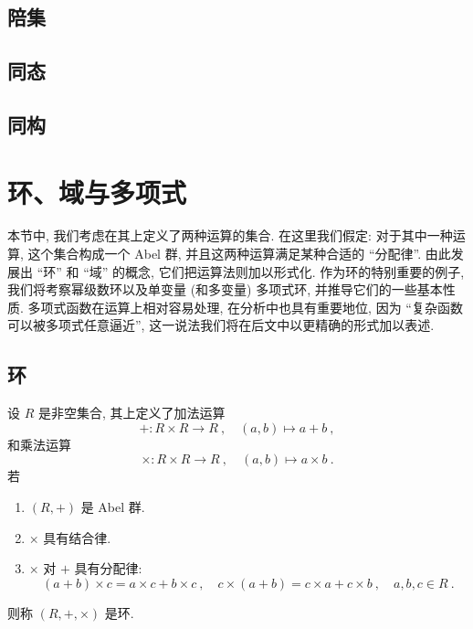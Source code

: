 \subsection{陪集}

\subsection{同态}

\begin{remark}\label{rem:group-homo}
    
\end{remark}

\subsection{同构}

\newpage

\section{环、域与多项式}

本节中, 我们考虑在其上定义了两种运算的集合. 在这里我们假定: 对于其中一种运算, 这个集合构成一个 Abel 群, 并且这两种运算满足某种合适的 ``分配律''. 由此发展出 ``环'' 和 ``域'' 的概念, 它们把运算法则加以形式化. 作为环的特别重要的例子, 我们将考察幂级数环以及单变量 (和多变量) 多项式环, 并推导它们的一些基本性质. 多项式函数在运算上相对容易处理, 在分析中也具有重要地位, 因为 ``复杂函数可以被多项式任意逼近'', 这一说法我们将在后文中以更精确的形式加以表述.

\subsection{环}

\begin{axiom}[环]\label{ax:ring}
    设 \(R\) 是非空集合, 其上定义了加法运算
    \[
        + \colon R \times R \to R\ ,\quad (a, b) \mapsto a + b\ ,
    \]
    和乘法运算
    \[
    \times \colon R \times R \to R\ ,\quad (a, b) \mapsto a \times b\ .
    \]
    若
    \begin{enumerate}[label={\((\mathrm R_{\arabic*})\)}]
        \item \((R, +)\) 是 Abel 群.
        \item \(\times\) 具有结合律.
        \item \(\times\) 对 \(+\) 具有分配律:
        \[
            (a + b) \times c = a \times c + b \times c\ ,\quad c \times (a + b) = c \times a + c \times b\ ,\quad a, b, c \in R\ .
        \]
    \end{enumerate}
    则称 \((R, +, \times)\) 是环.
\end{axiom}

